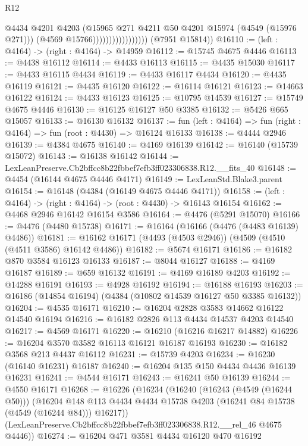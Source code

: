 \begin{lexlean}{R12}
\begin{coremodule}
                                      @4434
                                      @4201
                                      @4203
                                      (@15965 @271 @4211 @50 @4201 @15974 (@4549 (@15976 @271)))
                                      (@4569 @15766)))))))))))))))))
      (@7951 @15814))
@16110 := (left : @4164) -> (right : @4164) -> @14959
@16112 := @15745 @4675 @4446
@16113 := @4438 @16112
@16114 := @4433 @16113
@16115 := @4435 @15030
@16117 := @4433 @16115 @4434
@16119 := @4433 @16117 @4434
@16120 := @4435 @16119
@16121 := @4435 @16120
@16122 := @16114 @16121
@16123 := @14663 @16122
@16124 := @4433 @16123
@16125 := @10795 @14539
@16127 := @15749 @4675 @4446
@16130 := @16125 @16127 @50 @3385
@16132 := @5426 @665 @15057
@16133 := @16130 @16132
@16137 := fun (left : @4164) => fun (right : @4164) => fun (root : @4430) => @16124 @16133
@16138 := @4444 @2946
@16139 := @4384 @4675
@16140 := @4169 @16139
@16142 := @16140 (@15739 @15072)
@16143 := @16138 @16142
@16144 := LexLeanPreserve.Cb2bffcc8b22fbbef7efb3ff023306838.R12.__fits_40
@16148 := @4454 (@16144 @4675 @4446 @4171)
@16149 := LexLeanStd.Blake3.parent
@16154 := @16148 (@4384 (@16149 @4675 @4446 @4171))
@16158 := (left : @4164) -> (right : @4164) -> (root : @4430) -> @16143 @16154
@16162 := @4468 @2946 @16142 @16154 @3586
@16164 := @4476 (@5291 @15070)
@16166 := @4476 (@4480 @15738)
@16171 := @16164 (@16166 (@4476 (@4483 @16139) @4486))
@16181 := @16162 @16171 (@4493 (@4503 @2946)) (@4509 (@4510 (@4511 @3586) @16142 @4486))
@16182 := @5674 @16171
@16186 := @16182 @870 @3584 @16123 @16133
@16187 := @8044 @16127
@16188 := @4169 @16187
@16189 := @659 @16132
@16191 := @4169 @16189 @4203
@16192 := @14288 @16191
@16193 := @4928 @16192
@16194 := @16188 @16193
@16203 := @16186 (@14854 @16194) (@4384 (@10802 @14539 @16127 @50 @3385 @16132))
@16204 := @4535 @16171
@16210 := @16204 @2828 @3583 @14662 @16122 @14540 @16194
@16216 := @16182 @2826 @113 @4434 @14537 @4203 @14540
@16217 := @4569 @16171
@16220 := @16210 (@16216 @16217 @14882)
@16226 := @16204 @3570 @3582 @16113 @16121 @16187 @16193
@16230 := @16182 @3568 @213 @4437 @16112
@16231 := @15739 @4203
@16234 := @16230 (@16140 @16231) @16187
@16240 := @16204 @135 @150 @4434 @4436 @16139 @16231
@16241 := @4544 @16171
@16243 := @16241 @50 @16139
@16244 := @4550 @16171
@16268 := @16226
    (@16234
      (@16240
        (@16243 (@4549 (@16244 @50)))
        (@16204 @148 @113 @4434 @4434 @15738 @4203 (@16241 @84 @15738 (@4549 (@16244 @84))) @16217))
      (LexLeanPreserve.Cb2bffcc8b22fbbef7efb3ff023306838.R12.__rel_46 @4675 @4446))
@16274 := @16204 @471 @3581 @4434 @16120 @470 @16192

\end{coremodule}
\end{lexlean}
